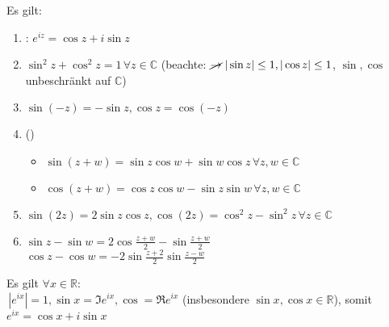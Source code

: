\begin{proposition}
	Es gilt:
	\begin{enumerate}[label={\arabic*)}]
		\item {}: $e^{iz} = \cos z + i \sin z$
		\item $\sin^2 z + \cos^2 z = 1\,\forall z\in\mathbb{C}$ (beachte: $\cancel{\rightarrow}\;|\sin z|\le1, |\cos z| \le 1$, $\sin, \cos$ unbeschränkt auf $\mathbb{C}$)
		\item $\sin(-z) = -\sin z, \cos z = \cos(-z)$
		\item ()
		\begin{itemize}
			\item $\sin(z+w) = \sin z \cos w + \sin w \cos z \,\forall z,w\in\mathbb{C}$
			\item $\cos (z+w) = \cos z \cos w - \sin z \sin w \,\forall z,w\in\mathbb{C}$
		\end{itemize}
		\item $\sin(2z) = 2\sin z \cos z, \cos(2z) = \cos^2 z - \sin^2 z\,\forall z\in\mathbb{C}$
		\item $\sin z - \sin w = 2\cos \frac{z+w}{2} - \sin \frac{z+w}{2}$\\
			  $\cos z - \cos w = -2\sin\frac{z+2}{2}\sin\frac{z-w}{2}$
	\end{enumerate}
\end{proposition}

\begin{proposition}
	Es gilt $\forall x\in \mathbb{R}:$\\
	$\,\left| e^{ix}\right| = 1, \sin x = \Im e^{ix}, \cos = \Re e^{ix}$ (insbesondere $\sin x,\cos x \in\mathbb{R}$), somit $e^{ix} = \cos x + i \sin x$
\end{proposition}

